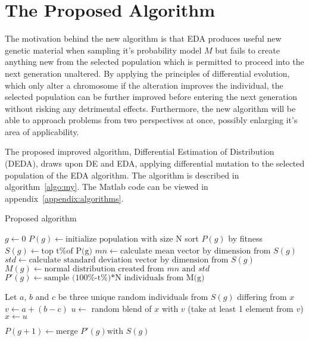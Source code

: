 \section{The Proposed Algorithm}

The motivation behind the new algorithm is that EDA produces useful new genetic material when sampling it's probability model $M$ but fails to create anything new from the selected population which is permitted to proceed into the next generation unaltered. By applying the principles of differential evolution, which only alter a chromosome if the alteration improves the individual, the selected population can be further improved before entering the next generation without risking any detrimental effects. Furthermore, the new algorithm will be able to approach problems from two perspectives at once, possibly enlarging it's area of applicability.

The proposed improved algorithm, Differential Estimation of Distribution (DEDA), draws upon DE and EDA, applying differential mutation to the selected population of the EDA algorithm. The algorithm is described in algorithm~\ref{algo:my}. The Matlab code can be viewed in appendix~\ref{appendix:algorithms}.


\begin{algorithm}[h]
  \caption{Proposed algorithm}
  \label{algo:my}
    \begin{algorithmic}
      \State $g\gets 0$
      \State $P(g)\gets \text{initialize population with size N}$
      \Repeat
        \State sort $P(g)$ by fitness
        \State $S(g)\gets \text{top t\% of P(g)}$
        \State $mn\gets \text{calculate mean vector by dimension from } S(g)$
        \State $std\gets \text{calculate standard deviation vector by dimension from } S(g)$
        \State $M(g)\gets \text{normal distribution created from } mn \text{ and } std$
        \State $P'(g)\gets \text{sample (100\%-t\%)*N individuals from M(g)}$

          \State Let $a$, $b$ and $c$ be three unique random individuals from $S(g)$ differing from $x$
          \State $v\gets a+(b-c)$
          \State $u\gets$ random blend of $x$ with $v$ (take at least 1 element from $v$)
            \State $x\gets u$
          \EndIf
        \EndFor

        \State $P(g+1)\gets \text{merge } P'(g) \text{with } S(g)$
    \end{algorithmic}
\end{algorithm}

